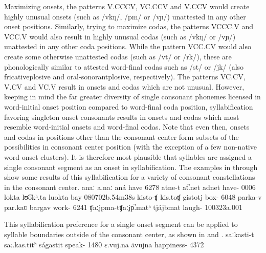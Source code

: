 Maximizing onsets, the patterns V.CCCV, VC.CCV and V.CCV would create highly unusual onsets (such as /vkŋ/, /pm/ or /vɲ/) unattested in any other onset positions. 
Similarly, trying to maximize codas, the patterns VCCC.V and VCC.V would also result in highly unusual codas (such as /vkŋ/ or /vɲ/) unattested in any other coda positions. 
While the pattern VCC.CV would also create some otherwise unattested codas (such as /vt/ or /rk/), these are phonologically similar to attested word-final codas such as /st/ or /jk/ (also fricative\PLUS plosive and oral-sonorant\PLUS plosive, respectively). 
The patterns VC.CV, V.CV and VC.V result in onsets and codas which are not unusual. However, keeping in mind the far greater diversity of single consonant phonemes licensed in word-initial onset position compared to word-final coda position, syllabification favoring singleton onset consonants results in onsets and codas which most resemble word-initial onsets and word-final codas. Note that even then, onsets and codas in positions other than the consonant center form subsets of the possibilities in consonant center position (with the exception of a few non-native word-onset clusters). It is therefore most plausible that syllables are assigned a single consonant segment as an onset in syllabification. The examples in  through  %
show some results of this syllabification for a variety of consonant constellations in the consonant center.
	{anaː}	{a.naː}		{aná}	{have\BS{}}	{6278}
		{atne-t}	{at̚.net}		{adnet}	{have-}	{0006}
		{lokta}	{lʊ͡okʰ.ta}		{luokta}	{bay\BS{}}	{080702b}{.54m38s}
			{kisto-ʧ}	{kis.toʧ}		{gistotj}	{box-}		{6048}
	{parka-v}	{par.kaʋ}		{bargav}	{work-}	{6241}
		{ʧaːjpma-t}{ʧaːjp̚.matʰ}	{tjájbmat}	{laugh-}		{100323a}{.001}

This syllabification preference for a single onset segment can be applied to syllable boundaries outside of the consonant center, as shown in  and . 
		{saːkasti-t}	{saː.kas.titʰ}	{ságastit}	{speak-}			{1480}
	{ɛ.vuj.na}		{ävujna}	{happiness-}	{4372}

